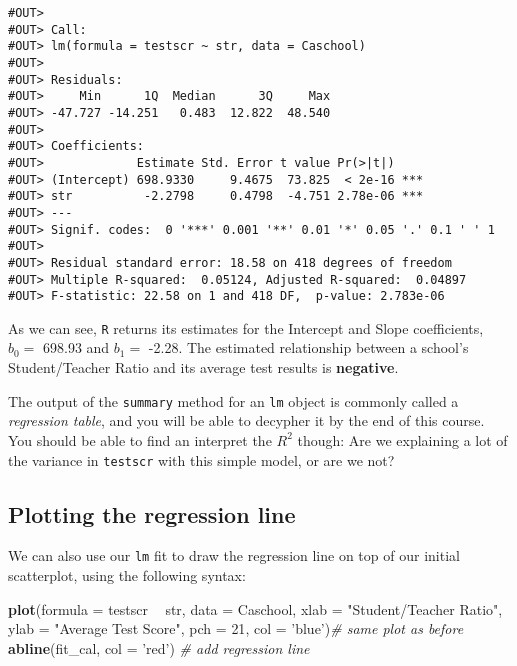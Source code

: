 \documentclass[]{book}
\newenvironment{Shaded}{\begin{snugshade}}{\end{snugshade}}
\newcommand{\KeywordTok}[1]{\textcolor[rgb]{0.13,0.29,0.53}{\textbf{#1}}}
\newcommand{\DataTypeTok}[1]{\textcolor[rgb]{0.13,0.29,0.53}{#1}}
\newcommand{\DecValTok}[1]{\textcolor[rgb]{0.00,0.00,0.81}{#1}}
\newcommand{\StringTok}[1]{\textcolor[rgb]{0.31,0.60,0.02}{#1}}
\newcommand{\CommentTok}[1]{\textcolor[rgb]{0.56,0.35,0.01}{\textit{#1}}}
\newcommand{\OperatorTok}[1]{\textcolor[rgb]{0.81,0.36,0.00}{\textbf{#1}}}
\newcommand{\NormalTok}[1]{#1}
\begin{document}
\begin{verbatim}
#OUT> 
#OUT> Call:
#OUT> lm(formula = testscr ~ str, data = Caschool)
#OUT> 
#OUT> Residuals:
#OUT>     Min      1Q  Median      3Q     Max 
#OUT> -47.727 -14.251   0.483  12.822  48.540 
#OUT> 
#OUT> Coefficients:
#OUT>             Estimate Std. Error t value Pr(>|t|)    
#OUT> (Intercept) 698.9330     9.4675  73.825  < 2e-16 ***
#OUT> str          -2.2798     0.4798  -4.751 2.78e-06 ***
#OUT> ---
#OUT> Signif. codes:  0 '***' 0.001 '**' 0.01 '*' 0.05 '.' 0.1 ' ' 1
#OUT> 
#OUT> Residual standard error: 18.58 on 418 degrees of freedom
#OUT> Multiple R-squared:  0.05124, Adjusted R-squared:  0.04897 
#OUT> F-statistic: 22.58 on 1 and 418 DF,  p-value: 2.783e-06
\end{verbatim}

As we can see, \texttt{R} returns its estimates for the Intercept and
Slope coefficients, \(b_0 =\) 698.93 and \(b_1 =\) -2.28. The estimated
relationship between a school's Student/Teacher Ratio and its average
test results is \textbf{negative}.

The output of the \texttt{summary} method for an \texttt{lm} object is
commonly called a \emph{regression table}, and you will be able to
decypher it by the end of this course. You should be able to find an
interpret the \(R^2\) though: Are we explaining a lot of the variance in
\texttt{testscr} with this simple model, or are we not?

\subsection{Plotting the regression
line}\label{plotting-the-regression-line}

We can also use our \texttt{lm} fit to draw the regression line on top
of our initial scatterplot, using the following syntax:

\begin{Shaded}
\begin{Highlighting}[]
\KeywordTok{plot}\NormalTok{(}\DataTypeTok{formula =}\NormalTok{ testscr }\OperatorTok{~}\StringTok{ }\NormalTok{str,}
     \DataTypeTok{data =}\NormalTok{ Caschool,}
     \DataTypeTok{xlab =} \StringTok{"Student/Teacher Ratio"}\NormalTok{,}
     \DataTypeTok{ylab =} \StringTok{"Average Test Score"}\NormalTok{, }\DataTypeTok{pch =} \DecValTok{21}\NormalTok{, }\DataTypeTok{col =} \StringTok{'blue'}\NormalTok{)}\CommentTok{# same plot as before}
\KeywordTok{abline}\NormalTok{(fit_cal, }\DataTypeTok{col =} \StringTok{'red'}\NormalTok{) }\CommentTok{# add regression line}
\end{Highlighting}
\end{Shaded}
\end{document}
